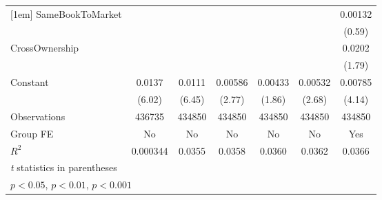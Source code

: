{\begin{tabular}{l*{6}{c}}
[1em]
SameBookToMarket&                  &                  &                  &                  &                  &  0.00132         \\
                &                  &                  &                  &                  &                  &   (0.59)         \\
[1em]
CrossOwnership  &                  &                  &                  &                  &                  &   0.0202         \\
                &                  &                  &                  &                  &                  &   (1.79)         \\
[1em]
Constant        &   0.0137\sym{***}&   0.0111\sym{***}&  0.00586\sym{**} &  0.00433         &  0.00532\sym{**} &  0.00785\sym{***}\\
                &   (6.02)         &   (6.45)         &   (2.77)         &   (1.86)         &   (2.68)         &   (4.14)         \\
\hline
Observations    &   436735         &   434850         &   434850         &   434850         &   434850         &   434850         \\
Group FE        &       No         &       No         &       No         &       No         &       No         &      Yes         \\
$ R^2 $         & 0.000344         &   0.0355         &   0.0358         &   0.0360         &   0.0362         &   0.0366         \\
\hline\hline
\multicolumn{7}{l}{\footnotesize \textit{t} statistics in parentheses}\\
\multicolumn{7}{l}{\footnotesize \sym{*} \(p<0.05\), \sym{**} \(p<0.01\), \sym{***} \(p<0.001\)}\\
\end{tabular}
}

